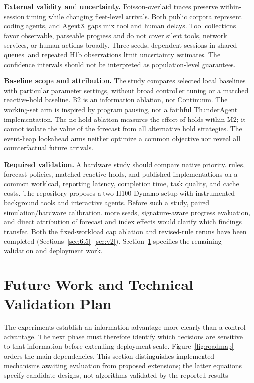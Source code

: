 \documentclass[11pt,a4paper]{article}
\begin{document}
\textbf{External validity and uncertainty.} Poisson-overlaid traces preserve within-session timing while changing fleet-level arrivals. Both public corpora represent coding agents, and AgentX gaps mix tool and human delays. Tool collections favor observable, parseable progress and do not cover silent tools, network services, or human actions broadly. Three seeds, dependent sessions in shared queues, and repeated H1b observations limit uncertainty estimates. The confidence intervals should not be interpreted as population-level guarantees.


\textbf{Baseline scope and attribution.} The study compares selected local baselines with particular parameter settings, without broad controller tuning or a matched reactive-hold baseline. B2 is an information ablation, not Continuum. The working-set arm is inspired by program pausing, not a faithful ThunderAgent implementation. The no-hold ablation measures the effect of holds within M2; it cannot isolate the value of the forecast from all alternative hold strategies. The event-heap lookahead arms neither optimize a common objective nor reveal all counterfactual future arrivals.


\textbf{Required validation.} A hardware study should compare native priority, rules, forecast policies, matched reactive holds, and published implementations on a common workload, reporting latency, completion time, task quality, and cache costs. The repository proposes a two-H100 Dynamo setup with instrumented background tools and interactive agents. Before such a study, paired simulation/hardware calibration, more seeds, signature-aware progress evaluation, and direct attribution of forecast and index effects would clarify which findings transfer. Both the fixed-workload cap ablation and revised-rule reruns have been completed (Sections~\ref{sec:6.5}--\ref{sec:v2}). Section~\ref{sec:future} specifies the remaining validation and deployment work.


\section{Future Work and Technical Validation Plan}
\label{sec:future}
The experiments establish an information advantage more clearly than a control advantage. The next phase must therefore identify which decisions are sensitive to that information before extending deployment scale. Figure~\ref{fig:roadmap} orders the main dependencies. This section distinguishes implemented mechanisms awaiting evaluation from proposed extensions; the latter equations specify candidate designs, not algorithms validated by the reported results.
\end{document}
